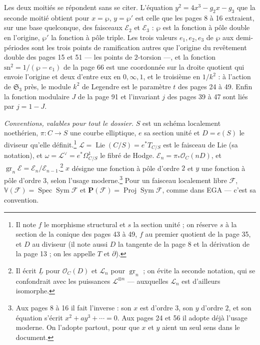 \documentclass[11pt,a4paper]{article}
\begin{document}
Les deux moitiés se répondent sans se citer. L'équation $y^2 = 4x^3 - g_2 x -
g_3$ que la seconde moitié obtient pour $x = \wp$, $y = \wp'$ est celle que les
pages 8 à 16 extraient, sur une base quelconque, des faisceaux $\mathcal{E}_2$
et $\mathcal{E}_3$ : $\wp$ est la fonction à pôle double en l'origine, $\wp'$
la fonction à pôle triple. Les trois valeurs $e_1, e_2, e_3$ de $\wp$ aux
demi-périodes sont les trois points de ramification autres que l'origine du
revêtement double des pages 15 et 51 --- les points de $2$-torsion ---, et la
fonction $\mathrm{sn}^2 = 1/(\wp - e_1)$ de la page 66 est une coordonnée sur la
droite quotient qui envoie l'origine et deux d'entre eux en $0, \infty, 1$, et le
troisième en $1/k^2$ : à l'action de $\mathfrak{S}_3$ près, le module $k^2$ de
Legendre est le paramètre $t$ des pages 24 à 49. Enfin la fonction modulaire $J$ de la page 91 et l'invariant $j$ des
pages 39 à 47 sont liés par $j = 1 - J$.

\emph{Conventions, valables pour tout le dossier.} $S$ est un schéma
localement noethérien, $\pi\colon C \to S$ une courbe elliptique, $e$ sa section
unité et $D = e(S)$ le diviseur qu'elle définit.\footnote{Il note $f$ le
morphisme structural et $s$ la section unité ; on réserve $s$ à la section de
la conique des pages 43 à 49, $f$ au premier quotient de la page 35, et $D$ au
diviseur (il note aussi $D$ la tangente de la page 8 et la dérivation de la
page 13 ; on les appelle $T$ et $\partial$).} $\mathcal{L} =
\operatorname{Lie}(C/S) = e^*T_{C/S}$ est le faisceau de Lie (sa notation), et
$\omega = \mathcal{L}^\vee = e^*\Omega^1_{C/S}$ le fibré de Hodge.
$\mathcal{E}_n = \pi_*\mathcal{O}_C(nD)$, et $\operatorname{gr}_n\mathcal{E} =
\mathcal{E}_n/\mathcal{E}_{n-1}$.\footnote{Il écrit $\underline{L}$ pour
$\mathcal{O}_C(D)$ et $\mathcal{L}_n$ pour $\operatorname{gr}_n$ ; on évite la
seconde notation, qui se confondrait avec les puissances $\mathcal{L}^{\otimes n}$
--- auxquelles $\mathcal{L}_n$ est d'ailleurs isomorphe.} $x$ désigne une
fonction à pôle d'ordre $2$ et $y$ une fonction à pôle d'ordre $3$, selon
l'usage moderne.\footnote{Aux pages 8 à 16 il fait l'inverse : son $x$ est
d'ordre $3$, son $y$ d'ordre $2$, et son équation s'écrit $x^2 + ay^3 +
\cdots = 0$. Aux pages 24 et 56 il adopte déjà l'usage moderne. On l'adopte
partout, pour que $x$ et $y$ aient un seul sens dans le document.} Pour un
faisceau localement libre $\mathcal{F}$, $\mathbb{V}(\mathcal{F}) =
\operatorname{Spec}\operatorname{Sym}\mathcal{F}$ et $\mathbf{P}(\mathcal{F}) =
\operatorname{Proj}\operatorname{Sym}\mathcal{F}$, comme dans EGA --- c'est sa
convention.
\end{document}
